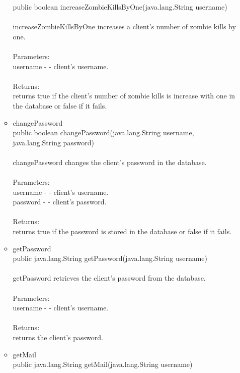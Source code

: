 \documentclass[letterpaper]{article}
\begin{document}
\begin{itemize}
\begin{itemize}
											public boolean increaseZombieKillsByOne(java.lang.String username) \\ \\
											increaseZombieKillsByOne increases a client's number of zombie kills by one. \\ \\
											Parameters: \\
											username - - client's username. \\ \\
											Returns: \\
											returns true if the client's number of zombie kills is increase with one in the database or false if it fails.
									\item	changePassword \\
											public boolean changePassword(java.lang.String username, \\
		                     java.lang.String password) \\ \\
											changePassword changes the client's password in the database. \\ \\
											Parameters: \\
											username - - client's username. \\
											password - - client's password. \\ \\
											Returns: \\
											returns true if the password is stored in the database or false if it fails.
									\item	getPassword \\
											public java.lang.String getPassword(java.lang.String username) \\ \\
											getPassword retrieves the client's password from the database. \\ \\
											Parameters: \\
											username - - client's username. \\ \\
											Returns: \\
											returns the client's password.
									\item	getMail \\
											public java.lang.String getMail(java.lang.String username) \\ \\

\end{itemize}
\end{itemize}
\end{document}

